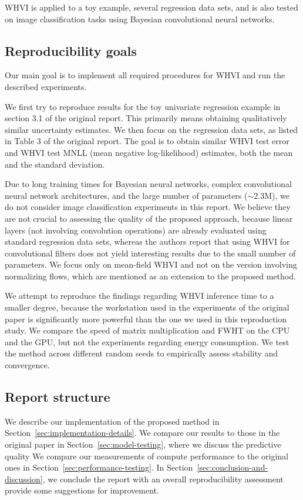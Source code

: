 WHVI is applied to a toy example, several regression data sets, and is also tested on image classification tasks using Bayesian convolutional neural networks.

\subsection{Reproducibility goals}\label{subsec:reproducibility-goals}
Our main goal is to implement all required procedures for WHVI and run the described experiments.

We first try to reproduce results for the toy univariate regression example in section 3.1 of the original report.
This primarily means obtaining qualitatively similar uncertainty estimates.
We then focus on the regression data sets, as listed in Table 3 of the original report.
The goal is to obtain similar WHVI test error and WHVI test MNLL (mean negative log-likelihood) estimates, both the mean and the standard deviation.

Due to long training times for Bayesian neural networks, complex convolutional neural network architectures, and the large number of parameters ($\sim 2.3$M), we do not consider image classification experiments in this report.
We believe they are not crucial to assessing the quality of the proposed approach, because linear layers (not involving convolution operations) are already evaluated using standard regression data sets, whereas the authors report that using WHVI for convolutional filters does not yield interesting results due to the small number of parameters.
We focus only on mean-field WHVI and not on the version involving normalizing flows, which are mentioned as an extension to the proposed method.

We attempt to reproduce the findings regarding WHVI inference time to a smaller degree, because the workstation used in the experiments of the original paper is significantly more powerful than the one we used in this reproduction study.
We compare the speed of matrix multiplication and FWHT on the CPU and the GPU, but not the experiments regarding energy consumption.
We test the method across different random seeds to empirically assess stability and convergence.

\subsection{Report structure}\label{subsec:report-structure}
We describe our implementation of the proposed method in Section~\ref{sec:implementation-details}.
We compare our results to those in the original paper in Section~\ref{sec:model-testing}, where we discuss the predictive quality
We compare our measurements of compute performance to the original ones in Section~\ref{sec:performance-testing}.
In Section~\ref{sec:conclusion-and-discussion}, we conclude the report with an overall reproducibility assessment provide some suggestions for improvement.
